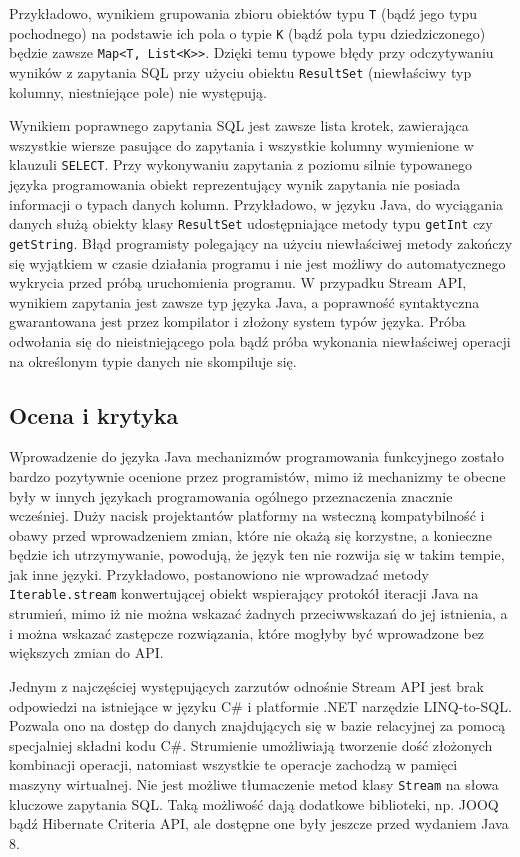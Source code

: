 \documentclass[12pt]{extarticle}
\begin{document}
    Przykładowo, wynikiem grupowania zbioru obiektów typu \texttt{T} (bądź jego typu pochodnego) na podstawie ich pola o typie \texttt{K} (bądź pola typu dziedziczonego) będzie zawsze \texttt{Map<T, List<K>}\texttt{>}. Dzięki temu typowe błędy przy odczytywaniu wyników z zapytania SQL przy użyciu obiektu \texttt{ResultSet} (niewłaściwy typ kolumny, niestniejące pole) nie występują.

    Wynikiem poprawnego zapytania SQL jest zawsze lista krotek, zawierająca wszystkie wiersze pasujące do zapytania i wszystkie kolumny wymienione w klauzuli \texttt{SELECT}. Przy wykonywaniu zapytania z poziomu silnie typowanego języka programowania obiekt reprezentujący wynik zapytania nie posiada informacji o typach danych kolumn. Przykładowo, w języku Java, do wyciągania danych służą obiekty klasy \texttt{ResultSet} udostępniające metody typu \texttt{getInt} czy \texttt{getString}. Błąd programisty polegający na użyciu niewłaściwej metody zakończy się wyjątkiem w czasie działania programu i nie jest możliwy do automatycznego wykrycia przed próbą uruchomienia programu. W przypadku Stream API, wynikiem zapytania jest zawsze typ języka Java, a poprawność syntaktyczna gwarantowana jest przez kompilator i złożony system typów języka. Próba odwołania się do nieistniejącego pola bądź próba wykonania niewłaściwej operacji na określonym typie danych nie skompiluje się. 
\subsection{Ocena i krytyka}

    Wprowadzenie do języka Java mechanizmów programowania funkcyjnego zostało bardzo pozytywnie ocenione przez programistów, mimo iż mechanizmy te obecne były w innych językach programowania ogólnego przeznaczenia znacznie wcześniej. Duży nacisk projektantów platformy na wsteczną kompatybilność i obawy przed wprowadzeniem zmian, które nie okażą się korzystne, a konieczne będzie ich utrzymywanie, powodują, że język ten nie rozwija się w takim tempie, jak inne języki. Przykładowo, postanowiono nie wprowadzać metody \texttt{Iterable.stream} konwertującej obiekt wspierający protokół iteracji Java na strumień, mimo iż nie można wskazać żadnych przeciwwskazań do jej istnienia, a i można wskazać zastępcze rozwiązania, które mogłyby być wprowadzone bez większych zmian do API.

    Jednym z najczęściej występujących zarzutów odnośnie Stream API jest brak odpowiedzi na istniejące w języku C\# i platformie .NET narzędzie LINQ-to-SQL. Pozwala ono na dostęp do danych znajdujących się w bazie relacyjnej za pomocą specjalniej składni kodu C\#. Strumienie umożliwiają tworzenie dość złożonych kombinacji operacji, natomiast wszystkie te operacje zachodzą w pamięci maszyny wirtualnej. Nie jest możliwe tłumaczenie metod klasy \texttt{Stream} na słowa kluczowe zapytania SQL. Taką możliwość dają dodatkowe biblioteki, np. JOOQ bądź Hibernate Criteria API, ale dostępne one były jeszcze przed wydaniem Java 8. 
\end{document}
